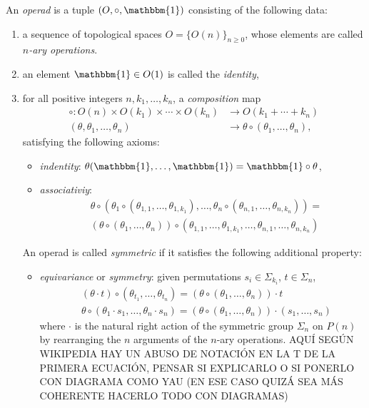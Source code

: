 \documentclass[TFM.tex]{subfiles}
\begin{document}
%
\begin{defi}
An \emph{operad} is a tuple $(O, \circ, \mathbbm{1})$ consisting of the following data:
\begin{enumerate}[(1)]
\item a sequence of topological spaces $O=\{O(n)\}_{n\geq 0}$, whose elements are called \emph{$n$-ary operations}.
\item an element $\mathbbm{1}\in O(1)$ is called the \emph{identity},
\item for all positive integers $n,k_1,\dots, k_n$, a \emph{composition} map
\begin{align*}
\circ:O(n)\times O(k_1)\times\cdots\times O(k_n)&\to O(k_1+\cdots+k_n)\\
(\theta, \theta_1,\dots, \theta_n)&\to \theta\circ(\theta_1,\dots, \theta_n),
\end{align*}
satisfying the following axioms:
\begin{itemize}
\item \emph{indentity}: $\theta(\mathbbm{1},\dots, \mathbbm{1})=\mathbbm{1}\circ\theta$,
\item \emph{associativiy}:
\begin{align*}
& \theta \circ (\theta_1 \circ (\theta_{1,1}, \ldots, \theta_{1,k_1}), \ldots, \theta_n \circ (\theta_{n,1}, \ldots,\theta_{n,k_n}))= \\
 {} & (\theta \circ (\theta_1, \ldots, \theta_n)) \circ (\theta_{1,1}, \ldots, \theta_{1,k_1}, \ldots, \theta_{n,1}, \ldots, \theta_{n,k_n})
\end{align*}
\end{itemize}

An operad is called \emph{symmetric} if it satisfies the following additional property:
\begin{itemize}
\item \emph{equivariance} or \emph{symmetry}: given permutations $s_i\in\Sigma_{k_i}$, $t\in\Sigma_n$,
\begin{align*}
& (\theta\cdot t)\circ(\theta_{t_1},\ldots,\theta_{t_n}) = (\theta\circ(\theta_1,\ldots,\theta_n))\cdot t \\[2pt]
& \theta\circ(\theta_1\cdot s_1,\ldots,\theta_n\cdot s_n) = (\theta\circ(\theta_1,\ldots,\theta_n))\cdot (s_1,\ldots,s_n)
\end{align*}
where $\cdot$ is the natural right action of the symmetric group $\Sigma_n$ on $P(n)$ by rearranging the $n$ arguments of the $n$-ary operations. AQUÍ SEGÚN WIKIPEDIA HAY UN ABUSO DE NOTACIÓN EN LA T DE LA PRIMERA ECUACIÓN, PENSAR SI EXPLICARLO O SI PONERLO CON DIAGRAMA COMO YAU (EN ESE CASO QUIZÁ SEA MÁS COHERENTE HACERLO TODO CON DIAGRAMAS)
\end{itemize}
\end{enumerate}
\end{defi}
\end{document}
